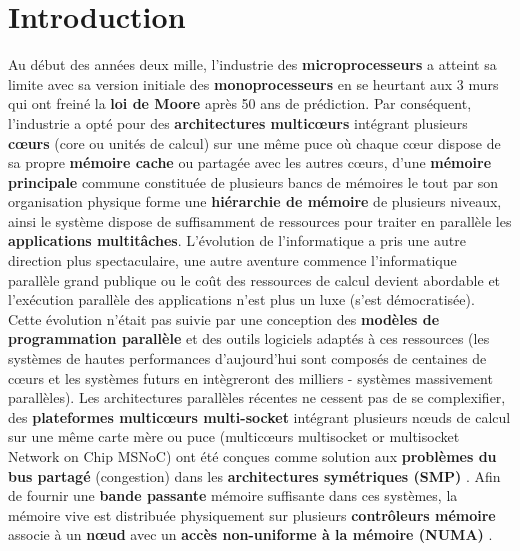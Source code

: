 ﻿\chapter{Introduction} 
\justify \hspace{\parindent}
Au début des années deux mille, l'industrie des \textbf{microprocesseurs} a atteint sa limite avec sa version initiale des \textbf{monoprocesseurs} en se heurtant aux 3 murs qui ont freiné la \textbf{loi de Moore} \cite{moor65} après 50 ans de prédiction.
%
Par conséquent, l'industrie a opté pour des \textbf{architectures multicœurs} intégrant plusieurs \textbf{cœurs} (core ou unités de calcul) sur une même puce où chaque cœur dispose de sa propre \textbf{mémoire cache} ou partagée avec les autres cœurs, d'une \textbf{mémoire principale} commune constituée de plusieurs bancs de mémoires 
le tout par son organisation physique forme une \textbf{hiérarchie de mémoire} de plusieurs niveaux, 
ainsi le système dispose de suffisamment de ressources pour traiter en parallèle les \textbf{applications multitâches}. 
%
L’évolution de l'informatique a pris une autre direction plus spectaculaire, une autre aventure commence l'informatique parallèle grand publique ou le coût des ressources de calcul devient abordable et l'exécution parallèle des applications n'est plus un luxe (s'est démocratisée). 
%
Cette évolution n'était pas suivie par une conception des \textbf{modèles de programmation parallèle} et des outils logiciels adaptés à ces ressources (les systèmes de hautes performances d'aujourd'hui sont composés de centaines de cœurs et les systèmes futurs en intègreront des milliers - systèmes massivement parallèles).
%
Les architectures parallèles récentes ne cessent pas de se complexifier, des \textbf{plateformes multicœurs multi-socket} intégrant plusieurs nœuds de calcul sur une même carte mère ou puce (multicœurs multisocket or multisocket Network on Chip MSNoC) \cite{msoc00} ont été conçues comme solution aux \textbf{problèmes du bus  partagé} (congestion) dans les \textbf{architectures symétriques (SMP)} \cite{qaca17}.  
Afin de fournir une \textbf{bande passante} mémoire suffisante dans ces systèmes, la mémoire vive est distribuée physiquement sur plusieurs \textbf{contrôleurs mémoire} associe à un \textbf{nœud} avec un \textbf{accès non-uniforme à la mémoire (NUMA)} \cite{qaca17}. 

